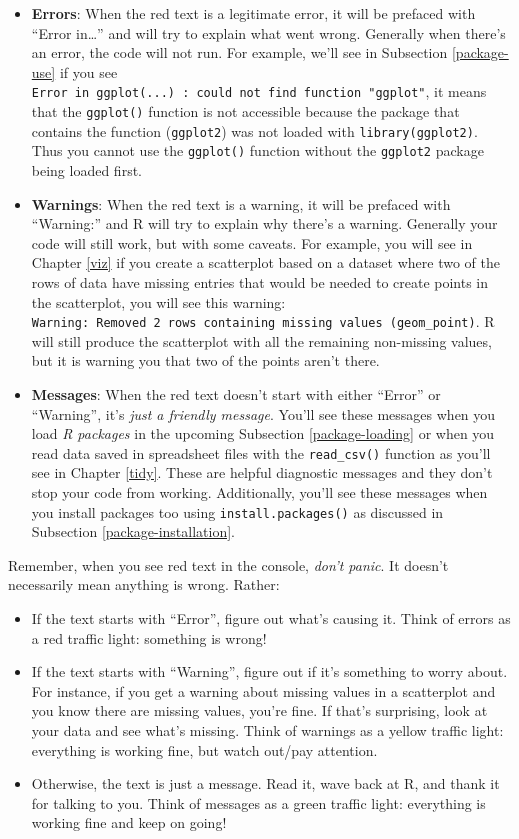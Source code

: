 \documentclass[]{book}
\providecommand{\tightlist}{%
  \setlength{\itemsep}{0pt}\setlength{\parskip}{0pt}}
\begin{document}
\begin{itemize}
\tightlist
\item
  \textbf{Errors}:  When the red text is a legitimate error, it will be prefaced with ``Error in\ldots{}'' and will try to explain what went wrong. Generally when there's an error, the code will not run. For example, we'll see in Subsection \ref{package-use} if you see \texttt{Error\ in\ ggplot(...)\ :\ could\ not\ find\ function\ "ggplot"}, it means that the \texttt{ggplot()} function is not accessible because the package that contains the function (\texttt{ggplot2}) was not loaded with \texttt{library(ggplot2)}. Thus you cannot use the \texttt{ggplot()} function without the \texttt{ggplot2} package being loaded first.
\item
  \textbf{Warnings}:  When the red text is a warning, it will be prefaced with ``Warning:'' and R will try to explain why there's a warning. Generally your code will still work, but with some caveats. For example, you will see in Chapter \ref{viz} if you create a scatterplot based on a dataset where two of the rows of data have missing entries that would be needed to create points in the scatterplot, you will see this warning: \texttt{Warning:\ Removed\ 2\ rows\ containing\ missing\ values\ (geom\_point)}. R will still produce the scatterplot with all the remaining non-missing values, but it is warning you that two of the points aren't there.
\item
  \textbf{Messages}:  When the red text doesn't start with either ``Error'' or ``Warning'', it's \emph{just a friendly message}. You'll see these messages when you load \emph{R packages} in the upcoming Subsection \ref{package-loading} or when you read data saved in spreadsheet files with the \texttt{read\_csv()} function as you'll see in Chapter \ref{tidy}. These are helpful diagnostic messages and they don't stop your code from working. Additionally, you'll see these messages when you install packages too using \texttt{install.packages()} as discussed in Subsection \ref{package-installation}.
\end{itemize}

Remember, when you see red text in the console, \emph{don't panic}. It doesn't necessarily mean anything is wrong. Rather:

\begin{itemize}
\tightlist
\item
  If the text starts with ``Error'', figure out what's causing it. {Think of errors as a red traffic light: something is wrong!}
\item
  If the text starts with ``Warning'', figure out if it's something to worry about. For instance, if you get a warning about missing values in a scatterplot and you know there are missing values, you're fine. If that's surprising, look at your data and see what's missing. {Think of warnings as a yellow traffic light: everything is working fine, but watch out/pay attention.}
\item
  Otherwise, the text is just a message. Read it, wave back at R, and thank it for talking to you. {Think of messages as a green traffic light: everything is working fine and keep on going!}
\end{itemize}
\end{document}
